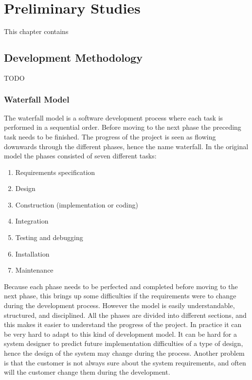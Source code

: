 
\chapter{Preliminary Studies} %

\label{Preliminary Studies} %


This chapter contains


\section{Development Methodology}

TODO

\subsection{Waterfall Model}

The waterfall model is a software development process where each task is performed in a sequential order.
Before moving to the next phase the preceding task needs to be finished.
The progress of the project is seen as flowing downwards through the different phases, hence the name waterfall.
In the original model the phases consisted of seven different tasks:

\begin{enumerate}
\item Requirements specification
\item Design
\item Construction (implementation or coding)
\item Integration
\item Testing and debugging
\item Installation
\item Maintenance
\end{enumerate}

Because each phase needs to be perfected and completed before moving to the next phase, this brings up some difficulties if the requirements were to change during the development process. 
However the model is easily understandable, structured, and disciplined. 
All the phases are divided into different sections, and this makes it easier to understand the progress of the project.
In practice it can be very hard to adapt to this kind of development model. 
It can be hard for a system designer to predict future implementation difficulties of a type of design, hence the design of the system may change during the process.
Another problem is that the customer is not always sure about the system requirements, and often will the customer change them during the development.

